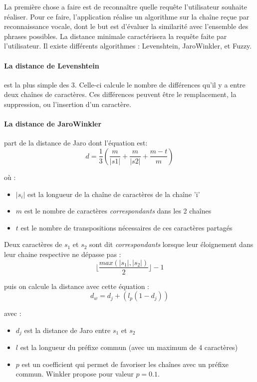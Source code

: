 La première chose a faire est de reconnaître quelle requête l'utilisateur souhaite réaliser. Pour ce faire, 
l'application réalise un algorithme sur la chaîne reçue par reconnaissance vocale, dont le but est d'évaluer 
la similarité avec l'ensemble des phrases possibles. La distance minimale caractérisera la requête faite par 
l'utilisateur. Il existe différents algorithmes : Levenshtein, JaroWinkler, et Fuzzy. 

\paragraph{La distance de Levenshtein}est la plus simple des 3. Celle-ci calcule le nombre de différences 
qu'il y a entre deux chaînes de caractères. Ces différences peuvent être le remplacement, la suppression, ou 
l'insertion d'un caractère.

\paragraph{La distance de JaroWinkler} part de la distance de Jaro dont l'équation est:
\begin{equation}
 d = \frac{1}{3}(\frac{m}{|s1|}+\frac{m}{|s2|}+\frac{m-t}{m})
\end{equation}

où :
\begin{itemize}
 \item $|s_i|$ est la longueur de la chaîne de caractères de la chaîne 'i'
 \item $m$ est le nombre de caractères \emph{correspondants} dans les 2 chaînes
 \item $t$ est le nombre de transpositions nécessaires de ces caractères partagés
\end{itemize}

Deux caractères de $s_1$ et $s_2$ sont dit \emph{correspondants} lorsque leur éloignement dans leur chaine 
respective ne dépasse pas :
\begin{equation}
 \lfloor{\frac{max(|s_1|, |s_2|)}{2}}\rfloor - 1
\end{equation}


puis on calcule la distance avec cette équation :
\begin{equation}
 d_w = d_j + (l_p(1-d_j))
\end{equation}

avec :
\begin{itemize}
 \item $d_j$ est la distance de Jaro entre $s_1$ et $s_2$
 \item $l$ est la longueur du préfixe commun (avec un maximum de 4 caractères)
 \item $p$ est un coefficient qui permet de favoriser les chaînes avec un préfixe commun. Winkler propose 
pour valeur $p=0.1$.

\end{itemize}


